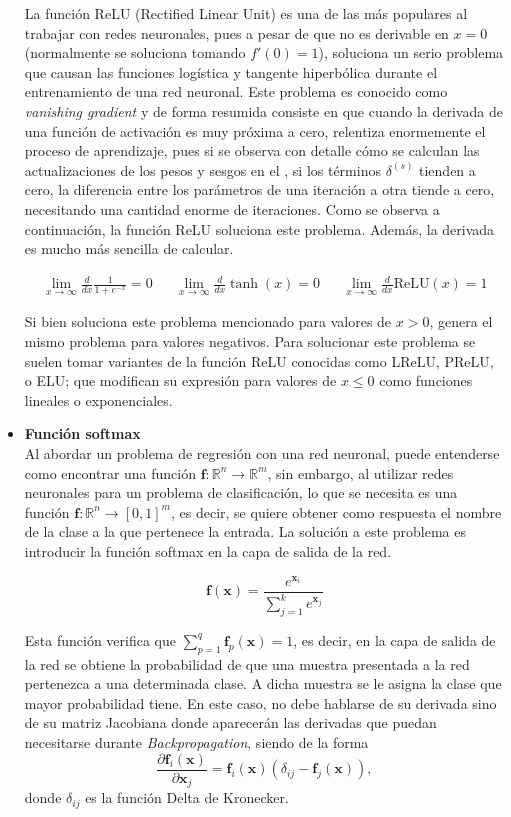 \begin{itemize}
				La función ReLU (Rectified Linear Unit) es una de las más populares al trabajar con redes neuronales, pues a pesar de que no es derivable en $x = 0$ (normalmente se soluciona tomando $f'(0) = 1$), soluciona un serio problema que causan las funciones logística y tangente hiperbólica durante el entrenamiento de una red neuronal. Este problema es conocido como \textit{vanishing gradient} y de forma resumida consiste en que cuando la derivada de una función de activación es muy próxima a cero, relentiza enormemente el proceso de aprendizaje, pues si se observa con detalle cómo se calculan las actualizaciones de los pesos y sesgos en el , si los términos $\delta^{(s)}$ tienden a cero, la diferencia entre los parámetros de una iteración a otra tiende a cero, necesitando una cantidad enorme de iteraciones. Como se observa a continuación, la función ReLU soluciona este problema. Además, la derivada es mucho más sencilla de calcular. 
				
				\begin{align*}
					\lim_{x\to\infty}\frac{d}{dx}\frac{1}{1+e^{-x}} = 0 && \lim_{x\to\infty}\frac{d}{dx}\tanh(x) = 0 && \lim_{x\to\infty}\frac{d}{dx}\text{ReLU}(x) = 1
				\end{align*}
				
				Si bien soluciona este problema mencionado para valores de $x > 0$, genera el mismo problema para valores negativos. Para solucionar este problema se suelen tomar variantes de la función ReLU conocidas como LReLU, PReLU, o ELU; que modifican su expresión para valores de $x \leq 0$ como funciones lineales o exponenciales. 
				
				\item \textbf{Función softmax}\\
				
				Al abordar un problema de regresión con una red neuronal, puede entenderse como encontrar una función $\textbf{f}: \mathbb{R}^n \longrightarrow \mathbb{R}^m$, sin embargo, al utilizar redes neuronales para un problema de clasificación, lo que se necesita es una función $\textbf{f}: \mathbb{R}^n \longrightarrow [0, 1]^m$, es decir, se quiere obtener como respuesta el nombre de la clase a la que pertenece la entrada. La solución a este problema es introducir la función softmax en la capa de salida de la red. 
				
				$$
				\textbf{f}(\textbf{x}) = \frac{e^{\textbf{x}_i}}{\displaystyle\sum_{j = 1}^{k}e^{\textbf{x}_j}}
				$$
				
				Esta función verifica que $\sum_{p=1}^q \textbf{f}_p(\textbf{x}) = 1$, es decir, en la capa de salida de la red se obtiene la probabilidad de que una muestra presentada a la red pertenezca a una determinada clase. A dicha muestra se le asigna la clase que mayor probabilidad tiene. En este caso, no debe hablarse de su derivada sino de su matriz Jacobiana donde aparecerán las derivadas que puedan necesitarse durante \textit{Backpropagation}, siendo de la forma
				$$
				\frac{\partial \textbf{f}_i(\textbf{x})}{\partial \textbf{x}_j} = \textbf{f}_i(\textbf{x})(\delta_{ij} - \textbf{f}_j(\textbf{x})), 
				$$
				donde $\delta_{ij}$ es la función Delta de Kronecker. 
				

\end{itemize}
